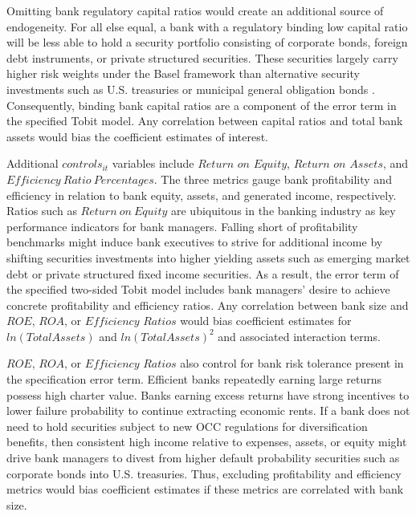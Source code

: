 \documentclass[preprint,12pt]{elsarticle}
\begin{document}
Omitting bank regulatory capital ratios would create an additional source of endogeneity.  For all else equal, a bank with a regulatory binding low capital ratio will be less able to hold a security portfolio consisting of corporate bonds, foreign debt instruments, or private structured securities.  These securities largely carry higher risk weights under the Basel framework than alternative security investments such as U.S. treasuries or municipal general obligation bonds \citep{RiskWeightsTool}.  Consequently, binding bank capital ratios are a component of the error term in the specified Tobit model.  Any correlation between capital ratios and total bank assets would bias the coefficient estimates of interest. 

Additional $controls_{it}$ variables include $Return$ $on$ $Equity$, $Return$ $on$ $Assets$, and $Efficiency \ Ratio \ Percentages$.  The three metrics gauge bank profitability and efficiency in relation to bank equity, assets, and generated income, respectively.  Ratios such as $Return \ on \ Equity$ are ubiquitous in the banking industry as key performance indicators for bank managers.  Falling short of profitability benchmarks might induce bank executives to strive for additional income by shifting securities investments into higher yielding assets such as emerging market debt or private structured fixed income securities.  As a result, the error term of the specified two-sided Tobit model includes bank managers' desire to achieve concrete profitability and efficiency ratios.  Any correlation between bank size and $ROE$, $ROA$, or $Efficiency$ $Ratios$ would bias coefficient estimates for $ln(TotalAssets)$ and $ln(TotalAssets)^{2}$ and associated interaction terms.  

$ROE$, $ROA$, or $Efficiency$ $Ratios$ also control for bank risk tolerance present in the specification error term. Efficient banks repeatedly earning large returns possess high charter value.  Banks earning excess returns have strong incentives to lower failure probability to continue extracting economic rents.  If a bank does not need to hold securities subject to new OCC regulations for diversification benefits, then consistent high income relative to expenses, assets, or equity might drive bank managers to divest from higher default probability securities such as corporate bonds into U.S. treasuries. Thus, excluding profitability and efficiency metrics would bias coefficient estimates if these metrics are correlated with bank size. 

\end{document}
